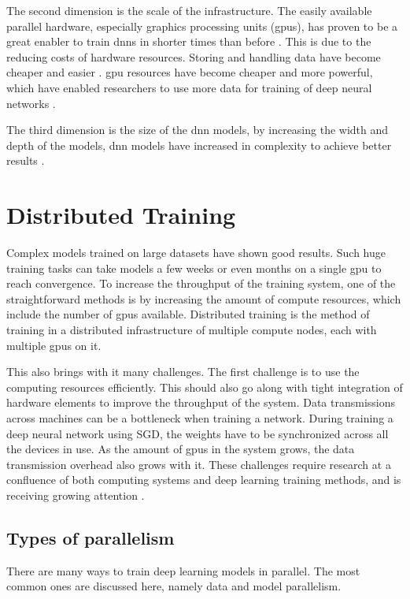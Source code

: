 The second dimension is the scale of the infrastructure. The easily available parallel hardware, especially graphics processing units (\acrshort{gpu}s), has proven to be a great enabler to train \acrshort{dnn}s in shorter times than before \cite{Zhang2017Poseidon:Clusters}. This is due to the reducing costs of hardware resources. Storing and handling data have become cheaper and easier \cite{Sayed2014ASecurity}. \acrshort{gpu} resources have become cheaper and more powerful, which have enabled researchers to use more data for training of deep neural networks \cite{Sayed2014ASecurity}. 

The third dimension is the size of the \acrshort{dnn} models, by increasing the width and depth of the models, \acrshort{dnn} models have increased in complexity to achieve better results \cite{Dean2012LargeNetworks}. 

\section{Distributed Training}
Complex models trained on large datasets have shown good results. Such huge training tasks can take models a few weeks or even months on a single \acrshort{gpu} to reach convergence. To increase the throughput of the training system, one of the straightforward  methods is by increasing the amount of compute resources, which include the number of \acrshort{gpu}s available. Distributed training is the method of training in a distributed infrastructure of multiple compute nodes, each with multiple \acrshort{gpu}s on it\cite{Langer2020DistributedPerspective}. 

This also brings with it many challenges. The first challenge is to use the computing resources efficiently. This should also go along with tight integration of hardware elements to improve the throughput of the system. Data transmissions across machines can be a bottleneck when training a network. During training a deep neural network using SGD, the weights have to be synchronized across all the devices in use. As the amount of \acrshort{gpu}s in the system grows, the data transmission overhead also grows with it. These challenges require research at a confluence of both computing systems and deep learning training methods, and is receiving growing attention \cite{Xiao2018Gandiva:Learning, Mai2020KungFu:Adaptive, Chilimbi2014ProjectSystem, Cui2016GeePS:Server, Peng2018Optimus:Clusters}.

\subsection{Types of parallelism}
There are many ways to train deep learning models in parallel. The most common ones are discussed here, namely data and model parallelism.

